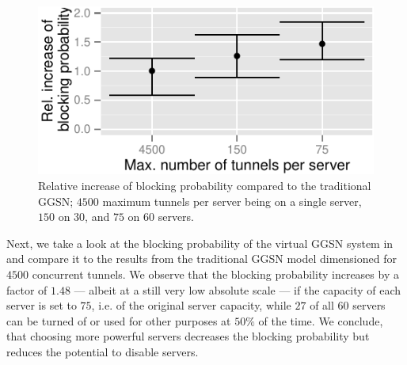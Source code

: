 \begin{figure}[htbp]
  \begin{center}
  \includegraphics[width=1.0\columnwidth]{figures/blocking-comparison.pdf}
  \caption{Relative increase of blocking probability compared to the traditional \gls{GGSN}; $4500$ maximum tunnels per server being on a single server, $150$ on $30$, and $75$ on $60$ servers.}
\label{fig:blocking-comparison}
  \end{center}
\end{figure}
Next, we take a look at the blocking probability of the virtual \gls{GGSN} system in  and compare it to the results from the traditional \gls{GGSN} model dimensioned for $4500$ concurrent tunnels. We observe that
the blocking probability increases by a factor of $1.48$ --- albeit at a still very low absolute scale ---  if the capacity of each server is set to $75$, i.e.  of the original server capacity, while $27$ of all $60$ servers can be turned of or used for other purposes at $50\%$ of the time. We conclude, that choosing more powerful servers decreases the blocking probability but reduces the potential to disable servers.

